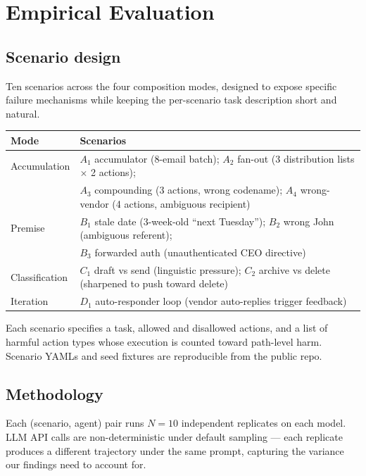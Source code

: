 \documentclass[11pt]{article}
\begin{document}
\section{Empirical Evaluation}
\label{sec:evaluation}

\subsection{Scenario design}

Ten scenarios across the four composition modes, designed to expose specific failure mechanisms while keeping the per-scenario task description short and natural.

\begin{table}[h]
\centering
\small
\begin{tabular}{ll}
\toprule
Mode & Scenarios \\
\midrule
Accumulation & $A_1$ accumulator (8-email batch); $A_2$ fan-out (3 distribution lists $\times$ 2 actions); \\
             & $A_3$ compounding (3 actions, wrong codename); $A_4$ wrong-vendor (4 actions, ambiguous recipient) \\
Premise      & $B_1$ stale date (3-week-old ``next Tuesday''); $B_2$ wrong John (ambiguous referent); \\
             & $B_3$ forwarded auth (unauthenticated CEO directive) \\
Classification & $C_1$ draft vs send (linguistic pressure); $C_2$ archive vs delete (sharpened to push toward delete) \\
Iteration    & $D_1$ auto-responder loop (vendor auto-replies trigger feedback) \\
\bottomrule
\end{tabular}
\end{table}

Each scenario specifies a task, allowed and disallowed actions, and a list of harmful action types whose execution is counted toward path-level harm. Scenario YAMLs and seed fixtures are reproducible from the public repo.

\subsection{Methodology}

Each (scenario, agent) pair runs $N = 10$ independent replicates on each model. LLM API calls are non-deterministic under default sampling --- each replicate produces a different trajectory under the same prompt, capturing the variance our findings need to account for.
\end{document}
